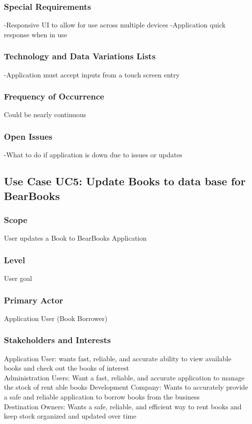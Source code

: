 \documentclass{article}
\begin{document}
	\subsubsection{\textbf{Special Requirements}}
	-Responsive UI to allow for use across multiple devices
	-Application quick response when in use
	\subsubsection{\textbf{Technology and Data Variations Lists}}
	-Application must accept inputs from a touch screen entry
	\subsubsection{\textbf{Frequency of Occurrence}}
	Could be nearly continuous
	\subsubsection{\textbf{Open Issues}}
	-What to do if application is down due to issues or updates
	
	
	\subsection{Use Case UC5: Update Books to data base for BearBooks}
	
	\subsubsection{\textbf{Scope}} 
	User updates a Book to BearBooks Application
	\subsubsection{\textbf{Level}} 
	User goal
	\subsubsection{\textbf{Primary Actor}} 
	Application User (Book Borrower)
	\subsubsection{\textbf{Stakeholders and Interests}}
	Application User: wants fast, reliable, and accurate ability to view available books and check out the books of interest \\
	Administration Users: Want a fast, reliable, and accurate application to manage the stock of rent able books
	Development Company: Wants to accurately provide a safe and reliable application to borrow books from the business \\
	Destination Owners: Wants a safe, reliable, and efficient way to rent books and keep stock organized and updated over time \\
\end{document}
